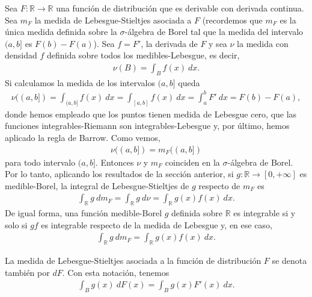 Sea $F: \mathbb{R} \longrightarrow \mathbb{R}$ una función de distribución que es derivable con derivada continua. Sea $m_F$ la medida de Lebesgue-Stieltjes asociada a $F$ (recordemos que $m_F$ es la única medida definida sobre la $\sigma$-álgebra de Borel tal que la medida del intervalo $(a,b]$ es $F(b) - F(a)$). Sea $f = F'$, la derivada de $F$ y sea $\nu$ la medida con densidad $f$ definida sobre todos los medibles-Lebesgue, es decir,
\begin{align*}
    \nu(B) = \int_{B}{f(x) \ dx}.
\end{align*}
Si calculamos la medida de los intervalos $(a,b]$ queda
\begin{align*}
    \nu((a,b]) = \int_{(a,b]}{f(x) \ dx} = \int_{[a,b]}{f(x) \ dx} = \int_{a}^{b}{F' \ dx} = F(b) - F(a), 
\end{align*}
donde hemos empleado que los puntos tienen medida de Lebesgue cero, que las funciones integrables-Riemann son integrables-Lebesgue y, por último, hemos aplicado la regla de Barrow. Como vemos,
\begin{align*}
    \nu((a,b]) = m_F((a,b])
\end{align*}
para todo intervalo $(a,b]$. Entonces $\nu$ y $m_F$ coinciden en la $\sigma$-álgebra de Borel. Por lo tanto, aplicando los resultados de la sección anterior, si $g: \mathbb{R} \longrightarrow [0,+\infty]$ es medible-Borel, la integral de Lebesgue-Stieltjes de $g$ respecto de $m_F$ es
\begin{align*}
    \int_{\mathbb{R}}{g \ dm_F} = \int_{\mathbb{R}}{g \ d\nu} = \int_{\mathbb{R}}{g(x)f(x) \ dx}.
\end{align*}
De igual forma, una función medible-Borel $g$ definida sobre $\mathbb{R}$ es integrable si y solo si $gf$ es integrable respecto de la medida de Lebesgue y, en ese caso,
\begin{align*}
    \int_{\mathbb{R}}{g \ dm_F} = \int_{\mathbb{R}}{g(x)f(x) \ dx}.
\end{align*}

La medida de Lebesgue-Stieltjes asociada a la función de distribución $F$ se denota también por $dF$. Con esta notación, tenemos
\begin{align*}
    \int_{B}{g(x) \ dF(x)} = \int_{B}{g(x)F'(x) \ dx}.
\end{align*}

